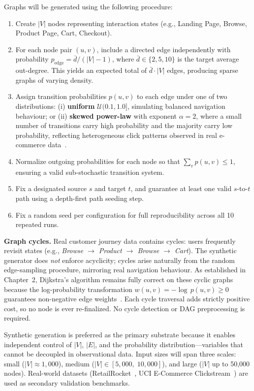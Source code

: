 Graphs will be generated using the following procedure:

\begin{enumerate}
    \item Create $|V|$ nodes representing interaction states (e.g., Landing Page, Browse, Product Page, Cart, Checkout).
    \item For each node pair $(u,v)$, include a directed edge independently with probability $p_{\text{edge}} = \bar{d}/(|V|-1)$, where $\bar{d} \in \{2, 5, 10\}$ is the target average out-degree. This yields an expected total of $\bar{d} \cdot |V|$ edges, producing sparse graphs of varying density.
    \item Assign transition probabilities $p(u,v)$ to each edge under one of two distributions: (i) \textbf{uniform} $\mathcal{U}(0.1, 1.0]$, simulating balanced navigation behaviour; or (ii) \textbf{skewed power-law} with exponent $\alpha = 2$, where a small number of transitions carry high probability and the majority carry low probability, reflecting heterogeneous click patterns observed in real e-commerce data~\citep{bucklin2003clickstream}.
    \item Normalize outgoing probabilities for each node so that $\sum_v p(u,v) \leq 1$, ensuring a valid sub-stochastic transition system.
    \item Fix a designated source $s$ and target $t$, and guarantee at least one valid $s$-to-$t$ path using a depth-first path seeding step.
    \item Fix a random seed per configuration for full reproducibility across all 10 repeated runs.
\end{enumerate}

\noindent\textbf{Graph cycles.} Real customer journey data contains cycles: users frequently revisit states (e.g., \textit{Browse $\to$ Product $\to$ Browse $\to$ Cart}). The synthetic generator does \emph{not} enforce acyclicity; cycles arise naturally from the random edge-sampling procedure, mirroring real navigation behaviour. As established in Chapter~2, Dijkstra's algorithm remains fully correct on these cyclic graphs because the log-probability transformation $w(u,v) = -\log\,p(u,v) \geq 0$ guarantees non-negative edge weights~\citep{cormen2009}. Each cycle traversal adds strictly positive cost, so no node is ever re-finalized. No cycle detection or DAG preprocessing is required.

Synthetic generation is preferred as the primary substrate because it enables independent control of $|V|$, $|E|$, and the probability distribution---variables that cannot be decoupled in observational data. Input sizes will span three scales: small ($|V| \approx 1{,}000$), medium ($|V| \in [5{,}000,\; 10{,}000]$), and large ($|V|$ up to 50,000 nodes). Real-world datasets (RetailRocket~\citep{retailrocket2015}, UCI E-Commerce Clickstream~\citep{uci2008eshop}) are used as secondary validation benchmarks.

